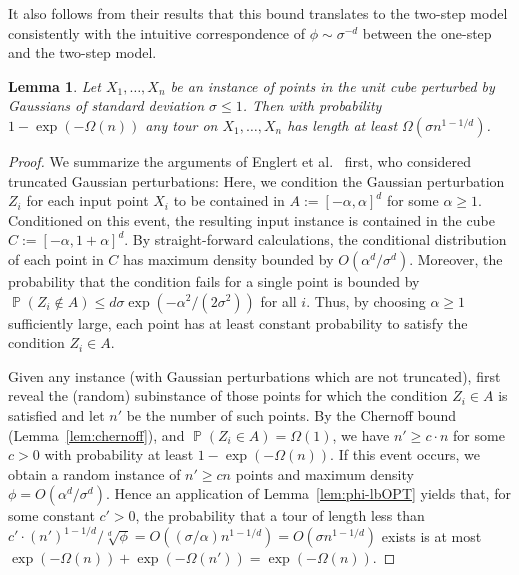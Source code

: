 \documentclass[11pt,DIV=12,a4paper]{scrartcl}
\newtheorem{lemma}[claim]{Lemma}
\DeclareMathOperator{\probab}{\mathbb{P}}
\begin{document}
It also follows from their results that this bound translates to the two-step model consistently with the intuitive correspondence of $\phi \sim \sigma^{-d}$ between the one-step and the two-step model. 
\begin{lemma}\label{lem:sigma-lbOPT}
Let $X_1,\dots,X_n$ be an instance of points in the unit cube perturbed by Gaussians of standard deviation $\sigma \le 1$. Then with probability $1-\exp(-\Omega(n))$ any tour on $X_1,\dots,X_n$ has length at least $\Omega(\sigma n^{1-1/d})$.
\end{lemma}
\begin{proof}
We summarize the arguments of Englert et al.~\cite[Section 6]{EnglertEA:2Opt:2014} first, who considered truncated Gaussian perturbations: Here, we condition the Gaussian perturbation $Z_i$ for each input point $X_i$ to be contained in $A := [-\alpha, \alpha]^d$ for some $\alpha \ge 1$. Conditioned on this event, the resulting input instance is contained in the cube $C := [-\alpha,1+\alpha]^d$. By straight-forward calculations, the conditional distribution of each point in $C$ has maximum density bounded by $O(\alpha^d/\sigma^d)$. Moreover, the probability that the condition fails for a single point is bounded by $\probab(Z_i \notin A) \le d\sigma \exp(-\alpha^2/(2\sigma^2))$ for all $i$. Thus, by choosing $\alpha\ge 1$ sufficiently large, each point has at least constant probability to satisfy the condition $Z_i\in A$.

Given any instance (with Gaussian perturbations which are not truncated), first reveal the (random) subinstance of those points for which the condition $Z_i \in A$ is satisfied and let $n'$ be the number of such points. By the Chernoff bound (Lemma~\ref{lem:chernoff}), and $\probab(Z_i\in A)= \Omega(1)$, we have $n' \ge c\cdot n$ for some $c>0$ with probability at least $1-\exp(-\Omega(n))$. If this event occurs, we obtain a random instance of $n'\ge cn$ points and maximum density $\phi = O(\alpha^d/\sigma^d)$. Hence an application of Lemma~\ref{lem:phi-lbOPT} yields that, for some constant $c'>0$, the probability that a tour of length less than $c' \cdot (n')^{1-1/d}/\sqrt[d]{\phi} = O((\sigma/\alpha) n^{1-1/d})=O(\sigma n^{1-1/d})$ exists is at most $\exp(-\Omega(n))+\exp(-\Omega(n'))=\exp(-\Omega(n))$.
\end{proof}
\end{document}
